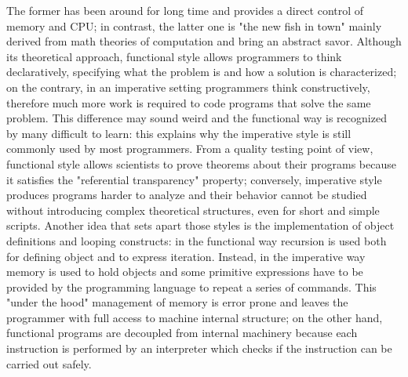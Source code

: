 The former has been around for long time and provides a direct control
of memory and CPU; in contrast, the latter one is "the new fish in
town" mainly derived from math theories of computation and bring an
abstract savor. Although its theoretical approach, functional style
allows programmers to think declaratively, specifying what the problem
is and how a solution is characterized; on the contrary, in an
imperative setting programmers think constructively, therefore much
more work is required to code programs that solve the same
problem. This difference may sound weird and the functional way is
recognized by many difficult to learn: this explains why the
imperative style is still commonly used by most programmers. From a
quality testing point of view, functional style allows scientists to
prove theorems about their programs because it satisfies the
"referential transparency" property; conversely, imperative style
produces programs harder to analyze and their behavior cannot be
studied without introducing complex theoretical structures, even for
short and simple scripts.  Another idea that sets apart those styles
is the implementation of object definitions and looping constructs:
in the functional way recursion is used both for defining object and
to express iteration. Instead, in the imperative way memory is used to
hold objects and some primitive expressions have to be provided by the
programming language to repeat a series of commands. This "under the
hood" management of memory is error prone and leaves the programmer
with full access to machine internal structure; on the other hand,
functional programs are decoupled from internal machinery because each
instruction is performed by an interpreter which checks if the
instruction can be carried out safely.

